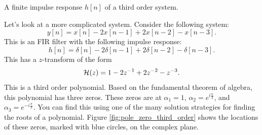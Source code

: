 \begin{marginfigure}
\begin{center}
\end{center}
\caption{A finite impulse response $h[n]$ of a third order system.}
\end{marginfigure}

Let's look at a more complicated system. Consider the following system:
\begin{equation}
y[n]= x[n]-2x[n-1]+2x[n-2]-x[n-3].
\end{equation}
This is an FIR filter with the following impulse response:
\begin{equation}
h[n]= \delta[n]-2\delta[n-1]+2\delta[n-2]-\delta[n-3].
\end{equation}
This has a $z$-transform of the form 
\begin{equation}
\mathcal{H}(z) = 1-2z^{-1} + 2z^{-2} - z^{-3}.
\end{equation}
This is a third order polynomial. Based on the fundamental theorem of algebra, this polynomial has three zeros. These zeros are at $\alpha_1=1$,
$\alpha_2=e^{i\frac{\pi}{3}}$, and $\alpha_3=e^{-i\frac{\pi}{3}}$. You can find
this using one of the many solution strategies for finding the roots
of a polynomial. Figure \ref{fig:pole_zero_third_order} shows the
locations of these zeros, marked with blue circles, on the complex
plane.



